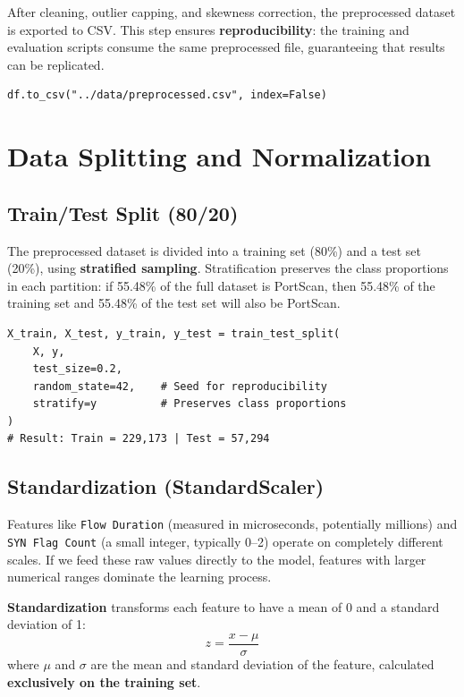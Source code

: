 After cleaning, outlier capping, and skewness correction, the preprocessed dataset is exported to CSV. This step ensures \textbf{reproducibility}: the training and evaluation scripts consume the same preprocessed file, guaranteeing that results can be replicated.

\begin{lstlisting}[caption={Exporting the preprocessed dataset}]
df.to_csv("../data/preprocessed.csv", index=False)
\end{lstlisting}

\section{Data Splitting and Normalization}

\subsection{Train/Test Split (80/20)}

The preprocessed dataset is divided into a training set (80\%) and a test set (20\%), using \textbf{stratified sampling}. Stratification preserves the class proportions in each partition: if 55.48\% of the full dataset is PortScan, then 55.48\% of the training set and 55.48\% of the test set will also be PortScan.

\begin{lstlisting}[caption={Stratified dataset splitting}]
X_train, X_test, y_train, y_test = train_test_split(
    X, y,
    test_size=0.2,
    random_state=42,    # Seed for reproducibility
    stratify=y          # Preserves class proportions
)
# Result: Train = 229,173 | Test = 57,294
\end{lstlisting}

\subsection{Standardization (StandardScaler)}
\label{sec:standardscaler}

Features like \texttt{Flow Duration} (measured in microseconds, potentially millions) and \texttt{SYN Flag Count} (a small integer, typically 0--2) operate on completely different scales. If we feed these raw values directly to the model, features with larger numerical ranges dominate the learning process.

\textbf{Standardization} transforms each feature to have a mean of 0 and a standard deviation of 1:
\begin{equation}
    z = \frac{x - \mu}{\sigma}
\end{equation}
where $\mu$ and $\sigma$ are the mean and standard deviation of the feature, calculated \textbf{exclusively on the training set}.

